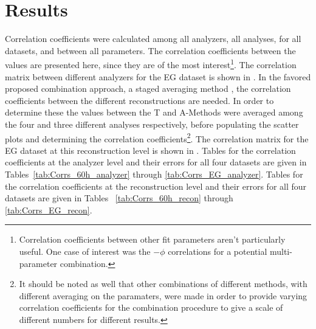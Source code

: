 
\graphicspath{{Body/Figures/Correlations/}}

\clearpage
\section{Results}


Correlation coefficients were calculated among all analyzers, all analyses, for all datasets, and between all parameters. The correlation coefficients between the \R values are presented here, since they are of the most interest\footnote{Correlation coefficients between other fit parameters aren't particularly useful. One case of interest was the \R$-\phi$ correlations for a potential multi-parameter combination.}. The correlation matrix between different analyzers for the EG dataset is shown in . In the favored proposed combination approach, a staged averaging method \cite{CombinationMeeting,DavidCollabTalk}, the correlation coefficients between the different reconstructions are needed. In order to determine these the \R values between the \RW T and A-Methods were averaged among the four and three different analyses respectively, before populating the scatter plots and determining the correlation coefficients\footnote{It should be noted as well that other combinations of different methods, with different averaging on the \R paramaters, were made in order to provide varying correlation coefficients for the combination procedure to give a scale of different numbers for different results.}. The correlation matrix for the EG dataset at this reconstruction level is shown in . Tables for the correlation coefficients at the analyzer level and their errors for all four datasets are given in Tables~\ref{tab:Corrs_60h_analyzer} through \ref{tab:Corrs_EG_analyzer}. Tables for the correlation coefficients at the reconstruction level and their errors for all four datasets are given in Tables ~\ref{tab:Corrs_60h_recon} through \ref{tab:Corrs_EG_recon}.



